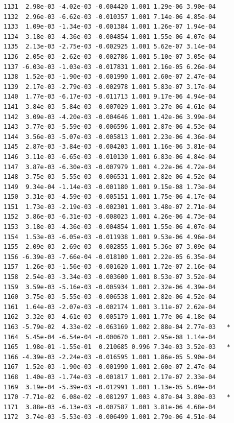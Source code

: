 \documentclass[
  letterpaper,
  DIV=11,
  numbers=noendperiod]{scrartcl}
\begin{document}
\begin{verbatim}
1131  2.98e-03 -4.02e-03 -0.004420 1.001 1.29e-06 3.90e-04    
1132  2.96e-03 -6.62e-03 -0.010357 1.001 7.14e-06 4.85e-04    
1133  1.09e-03 -1.34e-03 -0.001384 1.001 1.26e-07 1.94e-04    
1134  3.18e-03 -4.36e-03 -0.004854 1.001 1.55e-06 4.07e-04    
1135  2.13e-03 -2.75e-03 -0.002925 1.001 5.62e-07 3.14e-04    
1136  2.05e-03 -2.62e-03 -0.002786 1.001 5.10e-07 3.05e-04    
1137 -6.03e-03 -1.03e-03 -0.017831 1.001 2.16e-05 6.26e-04    
1138  1.52e-03 -1.90e-03 -0.001990 1.001 2.60e-07 2.47e-04    
1139  2.17e-03 -2.79e-03 -0.002978 1.001 5.83e-07 3.17e-04    
1140  1.77e-03 -6.17e-03 -0.011713 1.001 9.17e-06 4.94e-04    
1141  3.84e-03 -5.84e-03 -0.007029 1.001 3.27e-06 4.61e-04    
1142  3.09e-03 -4.20e-03 -0.004646 1.001 1.42e-06 3.99e-04    
1143  3.77e-03 -5.59e-03 -0.006596 1.001 2.87e-06 4.53e-04    
1144  3.56e-03 -5.07e-03 -0.005813 1.001 2.23e-06 4.36e-04    
1145  2.87e-03 -3.84e-03 -0.004203 1.001 1.16e-06 3.81e-04    
1146  3.11e-03 -6.65e-03 -0.010130 1.001 6.83e-06 4.84e-04    
1147  3.87e-03 -6.30e-03 -0.007979 1.001 4.22e-06 4.72e-04    
1148  3.75e-03 -5.55e-03 -0.006531 1.001 2.82e-06 4.52e-04    
1149  9.34e-04 -1.14e-03 -0.001180 1.001 9.15e-08 1.73e-04    
1150  3.31e-03 -4.59e-03 -0.005151 1.001 1.75e-06 4.17e-04    
1151  1.73e-03 -2.19e-03 -0.002301 1.001 3.48e-07 2.71e-04    
1152  3.86e-03 -6.31e-03 -0.008023 1.001 4.26e-06 4.73e-04    
1153  3.18e-03 -4.36e-03 -0.004854 1.001 1.55e-06 4.07e-04    
1154  1.53e-03 -6.05e-03 -0.011938 1.001 9.53e-06 4.96e-04    
1155  2.09e-03 -2.69e-03 -0.002855 1.001 5.36e-07 3.09e-04    
1156 -6.39e-03 -7.66e-04 -0.018100 1.001 2.22e-05 6.35e-04    
1157  1.26e-03 -1.56e-03 -0.001620 1.001 1.72e-07 2.16e-04    
1158  2.54e-03 -3.34e-03 -0.003600 1.001 8.53e-07 3.52e-04    
1159  3.59e-03 -5.16e-03 -0.005934 1.001 2.32e-06 4.39e-04    
1160  3.75e-03 -5.55e-03 -0.006538 1.001 2.82e-06 4.52e-04    
1161  1.64e-03 -2.07e-03 -0.002174 1.001 3.11e-07 2.62e-04    
1162  3.32e-03 -4.61e-03 -0.005179 1.001 1.77e-06 4.18e-04    
1163 -5.79e-02  4.33e-02 -0.063169 1.002 2.88e-04 2.77e-03   *
1164  5.45e-04 -6.54e-04 -0.000670 1.001 2.95e-08 1.14e-04    
1165  1.98e-01 -1.55e-01  0.210685 0.996 7.34e-03 3.52e-03   *
1166 -4.39e-03 -2.24e-03 -0.016595 1.001 1.86e-05 5.90e-04    
1167  1.52e-03 -1.90e-03 -0.001990 1.001 2.60e-07 2.47e-04    
1168  1.40e-03 -1.74e-03 -0.001817 1.001 2.17e-07 2.33e-04    
1169  3.19e-04 -5.39e-03 -0.012991 1.001 1.13e-05 5.09e-04    
1170 -7.71e-02  6.08e-02 -0.081297 1.003 4.87e-04 3.80e-03   *
1171  3.88e-03 -6.13e-03 -0.007587 1.001 3.81e-06 4.68e-04    
1172  3.74e-03 -5.53e-03 -0.006499 1.001 2.79e-06 4.51e-04    

\end{verbatim}
\end{document}
